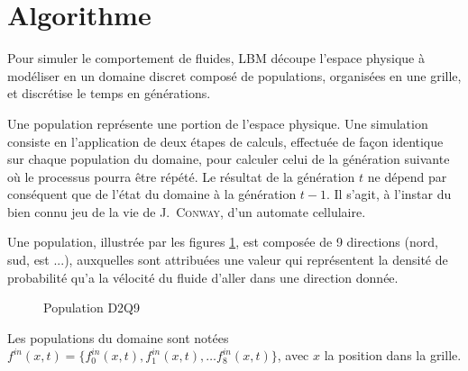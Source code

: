 
\section{Algorithme} \label{title-lbm_algo}
Pour simuler le comportement de fluides, \acs{LBM} découpe l'espace physique à modéliser en un domaine discret composé de populations, organisées en une grille, et discrétise le temps en générations. 

Une population représente une portion de l'espace physique. Une simulation consiste en l'application de deux étapes de calculs, effectuée de façon identique sur chaque population du domaine, pour calculer celui de la génération suivante où le processus pourra être répété. Le résultat de la génération $t$ ne dépend par conséquent que de l'état du domaine à la génération $t-1$.  Il s'agit, à l'instar du bien connu jeu de la vie de \textsc{J.~Conway}, d'un automate cellulaire.


Une population, illustrée par les figures \ref{fig:population_d2q9}, est composée de 9 directions (nord, sud, est ...), auxquelles sont attribuées une valeur qui représentent la densité de probabilité qu'a la vélocité du fluide d'aller dans une direction donnée.

\begin{figure}[h]
	\centering
	\caption{Population D2Q9}
	\label{fig:population_d2q9}
\end{figure}
Les populations du domaine sont notées $f^{in}(x,t) = \{f^{in}_0(x,t), f^{in}_1(x,t), \dots f^{in}_8(x,t)\}$, avec $x$ la position dans la grille.


